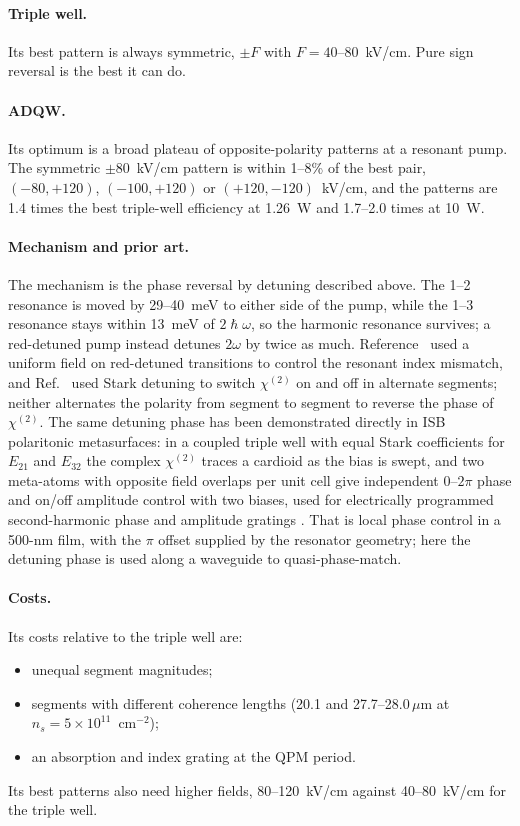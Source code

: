 \documentclass[11pt]{article}
\newcommand{\chitwo}{\chi^{(2)}}
\newcommand{\um}{\,\mu\mathrm{m}}
\begin{document}
\paragraph{Triple well.} Its best pattern is always symmetric, $\pm F$ with $F=40$--80~kV/cm. Pure sign reversal is the best it can do.

\paragraph{ADQW.} Its optimum is a broad plateau of opposite-polarity patterns at a resonant pump. The symmetric $\pm80$~kV/cm pattern is within 1--8\% of the best pair, $(-80,+120)$, $(-100,+120)$ or $(+120,-120)$~kV/cm, and the patterns are 1.4 times the best triple-well efficiency at 1.26~W and 1.7--2.0 times at 10~W.

\paragraph{Mechanism and prior art.} The mechanism is the phase reversal by detuning described above. The 1--2 resonance is moved by 29--40~meV to either side of the pump, while the 1--3 resonance stays within 13~meV of $2\hslash\omega$, so the harmonic resonance survives; a red-detuned pump instead detunes $2\omega$ by twice as much. Reference~\cite{Vurgaftman1996SSC} used a uniform field on red-detuned transitions to control the resonant index mismatch, and Ref.~\cite{Belkin2006} used Stark detuning to switch $\chitwo$ on and off in alternate segments; neither alternates the polarity from segment to segment to reverse the phase of $\chitwo$. The same detuning phase has been demonstrated directly in ISB polaritonic metasurfaces: in a coupled triple well with equal Stark coefficients for $E_{21}$ and $E_{32}$ the complex $\chitwo$ traces a cardioid as the bias is swept, and two meta-atoms with opposite field overlaps per unit cell give independent 0--$2\pi$ phase and on/off amplitude control with two biases, used for electrically programmed second-harmonic phase and amplitude gratings \cite{Yu2025}. That is local phase control in a 500-nm film, with the $\pi$ offset supplied by the resonator geometry; here the detuning phase is used along a waveguide to quasi-phase-match.

\paragraph{Costs.} Its costs relative to the triple well are:
\begin{itemize}
\item unequal segment magnitudes;
\item segments with different coherence lengths (20.1 and 27.7--28.0$\um$ at $n_s=5\times10^{11}$~cm$^{-2}$);
\item an absorption and index grating at the QPM period.
\end{itemize}
Its best patterns also need higher fields, 80--120~kV/cm against 40--80~kV/cm for the triple well.
\end{document}
